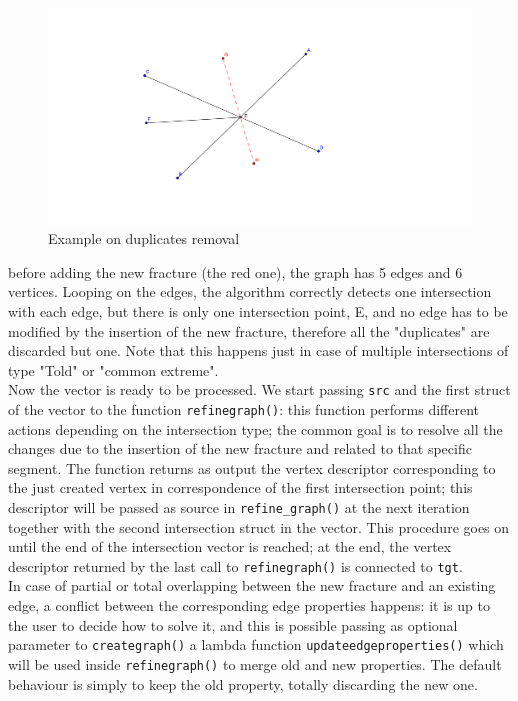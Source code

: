 \documentclass[10pt]{article} %
\begin{document}
	\begin{figure}
		\centering 
		\includegraphics[width=1\textwidth]{rem_dupl}
		\caption{Example on duplicates removal}
		\label{fig:rem_dupl}
	\end{figure}
	before adding the new fracture (the red one), the graph has 5 edges and 6 vertices. Looping on the edges, the algorithm correctly detects one intersection with each edge, but there is only one intersection point, E, and no edge has to be modified by the insertion of the new fracture, therefore all the "duplicates" are discarded but one. Note that this happens just in case of multiple intersections of type "Told" or "common extreme". \\
	Now the vector is ready to be processed. We start passing  \texttt{src} and the first struct of the vector to the function \texttt{refine\textunderscore graph()}: this function performs different actions depending on the intersection type; the common goal is to resolve all the changes due to the insertion of the new fracture and related to that specific segment. The function returns as output the vertex descriptor corresponding to the just created vertex in correspondence of the first intersection point; this descriptor will be passed as source in \texttt{refine\_graph()} at the next iteration together with the second intersection struct in the vector. This procedure goes on until the end of the intersection vector is reached; at the end, the vertex descriptor returned by the last call to \texttt{refine\textunderscore graph()} is connected to \texttt{tgt}. \\
	In case of partial or total overlapping between the new fracture and an existing edge, a conflict between the corresponding edge properties happens: it is up to the user to decide how to solve it, and this is possible passing as optional parameter to \texttt{create\textunderscore graph()} a lambda function \texttt{update\textunderscore edge\textunderscore properties()} which will be used inside \texttt{refine\textunderscore graph()} to merge old and new properties. The default behaviour is simply to keep the old property, totally discarding the new one.
	
\end{document}
